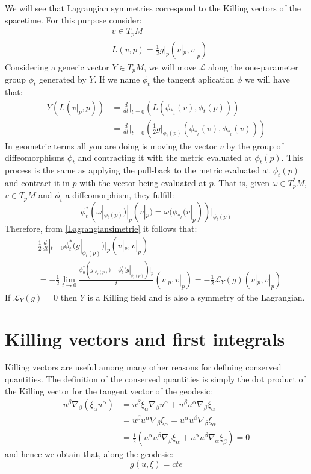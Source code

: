 We will see that Lagrangian symmetries correspond to the Killing vectors of the spacetime. For this purpose consider:
\begin{align}\label{lagrangianodeff}
&v \in T_p M \\
&L(v,p)= \frac{1}{2} g|_p (v|_p,v|_p)
\end{align}
Considering a generic vector $Y \in T_p M$, we will move $\mathcal{L}$ along the one-parameter group $\phi_t$ generated by $Y$. If we name $\phi_t$ the tangent aplication $\phi$ we will have that:
\begin{align}
Y(L(v|_p,p))&= \frac{d}{dt}|_{t=0} \left( L (\phi_{*_t}(v),\phi_t(p)) \right)  \\
&=\frac{d}{dt}|_{t=0} \left( \frac{1}{2} g|_{\phi_t(p)} (\phi_{*_t}(v),\phi_{*_t}(v)) \right) \label{Lagrangiansimetrie}
\end{align}
In geometric terms all you are doing is moving the vector $ v $ by the group of diffeomorphisms $\phi_t$ and contracting it with the metric evaluated at $\phi_t(p)$. This process is the same as applying the pull-back to the metric evaluated at $\phi_t(p)$ and contract it in $p$ with the vector being evaluated at $p$. That is, given $\omega \in T^*_pM$, $v \in T_pM$ and $\phi_t$ a diffeomorphism, they fulfill:
\begin{equation}
\phi_t^*(\omega|_{\phi_t(p)})|_p(v|_p)= \omega ( \phi_{*_t}(v|_p))|_{\phi_t(p)}
\end{equation}
Therefore, from \cref{Lagrangiansimetrie} it follows that:
\begin{align}
 & \frac{1}{2} \frac{d}{dt}|_{t=0} \phi^*_t(g|_{\phi_t(p)})|_p (v|_p,v|_p) \\
 &=-\frac{1}{2} \lim_{t \to 0} \frac{ \phi^*_0(g|_{\phi_t(p)}) - \phi^*_t(g|_{\phi_t(p)})|_p }{t}(v|_p,v|_p) =-\frac{1}{2} \mathcal{L}_Y(g)(v|_p,v|_p)
\end{align}
If $\mathcal{L}_Y(g)=0$ then $Y$ is a Killing field and is also a symmetry of the Lagrangian.

\section{Killing vectors and first integrals}

Killing vectors are useful among many other reasons for defining conserved quantities. The definition of the conserved quantities is simply the dot product of the Killing vector for the tangent vector of the geodesic:
\begin{align}
 u^\beta \nabla_\beta (\xi_\alpha u^\alpha)&= u^\beta \xi_\alpha \nabla_\beta  u^\alpha+ u^\beta u^\alpha \nabla_\beta \xi_\alpha  \\
&= u^\beta u^\alpha \nabla_\beta \xi_\alpha  = u^\alpha u^\beta \nabla_\beta  \xi_\alpha  \\ &= \frac{1}{2} \left( u^\alpha u^\beta \nabla_\beta \xi_\alpha  + u^\alpha u^\beta \nabla_\alpha \xi_\beta  \right) = 0 \label{killingintegrals}
\end{align}
and hence we obtain that, along the geodesic:
\begin{equation}\label{killingconstants}
g(u,\xi) = cte
\end{equation}

